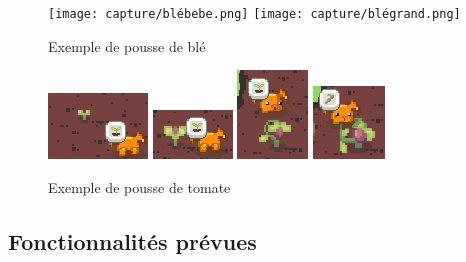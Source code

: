 \documentclass{article}
\begin{document}
\begin{figure}[h]
    \centering
    \texttt{[image: capture/blébebe.png]}
    \texttt{[image: capture/blégrand.png]} 
    \caption{Exemple de pousse de blé}
    \label{fig:pousse_ble}
\end{figure}
\begin{figure}[h]
    \centering
    \includegraphics{capture/tomateGraine.png}
    \includegraphics{capture/TomateMoyen.png}
    \includegraphics{capture/toamteAdulte.png}
    \includegraphics{capture/tomateFini.png}
    \caption{Exemple de pousse de tomate}
    \label{fig:pousse_tomate}
\end{figure}






\subsection{Fonctionnalités prévues}
\end{document}
